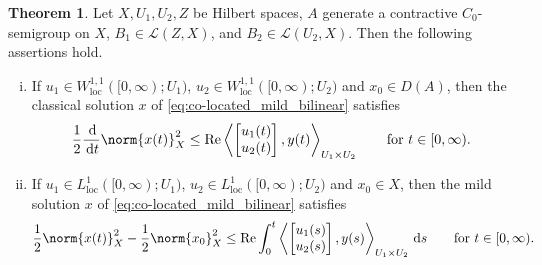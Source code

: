 \documentclass{cocv}
\renewcommand{\d}{\,\mathrm{d}}
\renewcommand{\Re}{\mathrm{Re}}
\newcommand{\ds}{ {\, \rm d} s}
\newcommand{\inprod}[2]{\left\langle#1,#2\right\rangle}
\DeclareMathOperator{\loc}{loc}
\theoremstyle{definition}
\newtheorem{theorem}{Theorem}
\begin{document}
\begin{theorem}\label{th:passivity_bounded_B}
    Let $X,U_1,U_2,Z$ be Hilbert spaces, $A$ generate a contractive $C_0$-semigroup on $X$, $B_1\in \mathcal{L}(Z,X)$, and $B_2 \in \mathcal L(U_2, X)$. Then the following assertions hold.
    \begin{enumerate}[(i)]
        \item If $u_1 \in W^{1,1}_{\loc}([0, \infty);U_1)$, $u_2 \in W^{1,1}_{\loc}([0, \infty); U_2)$ and $x_0 \in D(A)$, then the classical solution $x$ of \eqref{eq:co-located_mild_bilinear} satisfies
        \begin{equation*}
            \frac12\frac{\d}{\d t}\norm{x(t)}_X^2 \le \Re \inprod{\begin{bmatrix}u_1(t) \\ u_2(t)\end{bmatrix}}{y(t)}_{U_1 \times U_2} \qquad \text{for $t \in [0, \infty)$}.
        \end{equation*}

        \item If $u_1 \in L^{1}_{\loc}([0, \infty);U_1)$, $u_2 \in L^{1}_{\loc}([0, \infty); U_2)$ and $x_0 \in X$, then the mild solution $x$ of \eqref{eq:co-located_mild_bilinear} satisfies
        \begin{equation*}
            \frac12\norm{x(t)}_X^2 - \frac12\norm{x_0}_X^2 \le \Re \int_0^t \inprod{\begin{bmatrix}u_1(s) \\ u_2(s)\end{bmatrix}}{y(s)}_{U_1 \times U_2} \ds \qquad \text{for $t \in [0, \infty)$}.
        \end{equation*}
    \end{enumerate}
\end{theorem}
\end{document}
